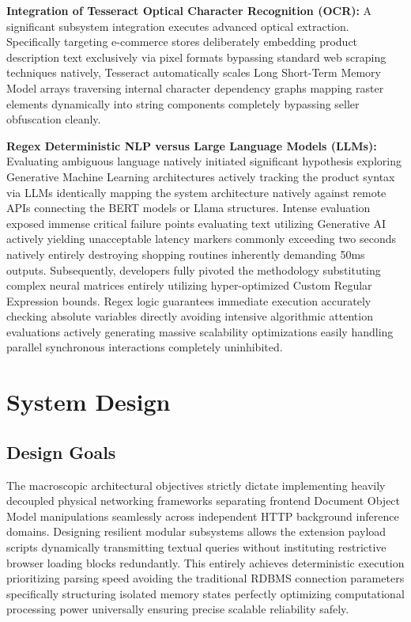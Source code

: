 \documentclass[12pt,a4paper]{report}
\begin{document}
\textbf{Integration of Tesseract Optical Character Recognition (OCR):} A significant subsystem integration executes advanced optical extraction. Specifically targeting e-commerce stores deliberately embedding product description text exclusively via pixel formats bypassing standard web scraping techniques natively, Tesseract automatically scales Long Short-Term Memory Model arrays traversing internal character dependency graphs mapping raster elements dynamically into string components completely bypassing seller obfuscation cleanly.

\textbf{Regex Deterministic NLP versus Large Language Models (LLMs):} Evaluating ambiguous language natively initiated significant hypothesis exploring Generative Machine Learning architectures actively tracking the product syntax via LLMs identically mapping the system architecture natively against remote APIs connecting the BERT models or Llama structures. Intense evaluation exposed immense critical failure points evaluating text utilizing Generative AI actively yielding unacceptable latency markers commonly exceeding two seconds natively entirely destroying shopping routines inherently demanding 50ms outputs. Subsequently, developers fully pivoted the methodology substituting complex neural matrices entirely utilizing hyper-optimized Custom Regular Expression bounds. Regex logic guarantees immediate execution accurately checking absolute variables directly avoiding intensive algorithmic attention evaluations actively generating massive scalability optimizations easily handling parallel synchronous interactions completely uninhibited.

\chapter{System Design}

\section{Design Goals}
The macroscopic architectural objectives strictly dictate implementing heavily decoupled physical networking frameworks separating frontend Document Object Model manipulations seamlessly across independent HTTP background inference domains. Designing resilient modular subsystems allows the extension payload scripts dynamically transmitting textual queries without instituting restrictive browser loading blocks redundantly. This entirely achieves deterministic execution prioritizing parsing speed avoiding the traditional RDBMS connection parameters specifically structuring isolated memory states perfectly optimizing computational processing power universally ensuring precise scalable reliability safely.
\end{document}
